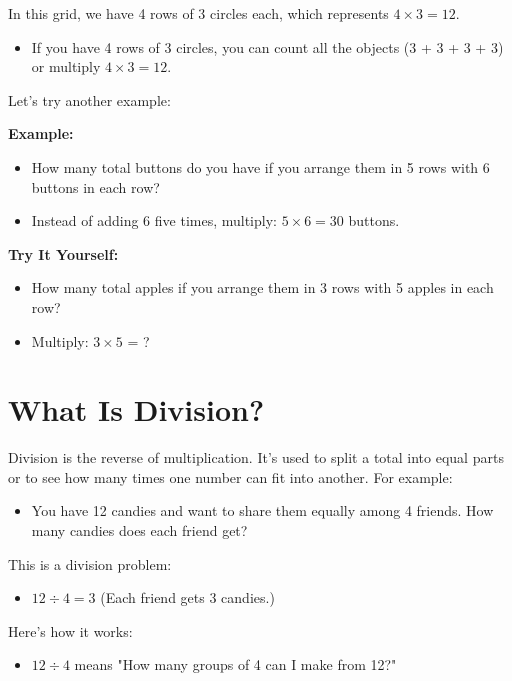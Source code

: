 In this grid, we have 4 rows of 3 circles each, which represents $4 \times 3 = 12$.
\begin{itemize}
    \item If you have 4 rows of 3 circles, you can count all the objects (3 + 3 + 3 + 3) or multiply $4 \times 3 = 12$.
\end{itemize}

Let’s try another example:

\textbf{Example:}
\begin{itemize}
    \item How many total buttons do you have if you arrange them in 5 rows with 6 buttons in each row?
    \item Instead of adding 6 five times, multiply: $5 \times 6 = 30$ buttons.
\end{itemize}

\textbf{Try It Yourself:}
\begin{itemize}
    \item How many total apples if you arrange them in 3 rows with 5 apples in each row?
    \item Multiply: $3 \times 5$ = ?
\end{itemize}

\section{What Is Division?}
Division is the reverse of multiplication. It’s used to split a total into equal parts or to see how many times one number can fit into another. For example:
\begin{itemize}
    \item You have 12 candies and want to share them equally among 4 friends. How many candies does each friend get?
\end{itemize}

This is a division problem:
\begin{itemize}
    \item $12 \div 4 = 3$ (Each friend gets 3 candies.)
\end{itemize}

Here’s how it works:
\begin{itemize}
    \item $12 \div 4$ means "How many groups of 4 can I make from 12?"
\end{itemize}

